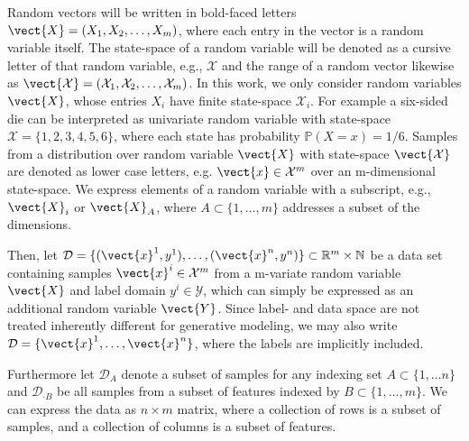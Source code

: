     Random vectors will be written in bold-faced letters $\vect{X} = (X_1, X_2, \ldots, X_m)$, where each entry in the vector is a random variable itself.
    The state-space of a random variable will be denoted as a cursive letter of that random variable, e.g., $\mathcal{X}$ and the range of a random vector likewise as $\vect{\mathcal{X}} = (\mathcal{X}_1, \mathcal{X}_2, \ldots, \mathcal{X}_m)$. 
    In this work, we only consider random variables $\vect{X}$, whose entries $X_i$ have finite state-space $\mathcal{X}_i$.
    For example a six-sided die can be interpreted as univariate random variable with state-space $\mathcal{X} = \{1,2,3,4,5,6\}$, where each state has probability $\mathbb{P}(X=x) = 1/6$.
    Samples from a distribution over random variable $\vect{X}$  with state-space $\vect{\mathcal{X}}$ are denoted as lower case letters, e.g. $\vect{x} \in \mathcal{X}^m$ over an m-dimensional state-space.
    We express elements of a random variable with a  subscript, e.g., $\vect{X}_i$ or $\vect{X}_A$, where $A \subset\{1, \ldots, m\} $ addresses a subset of the dimensions.

    Then, let $\mathcal{D} = \{(\vect{x}^1, y^1), \ldots, (\vect{x}^n, y^n)\} \subset \mathbb{R}^m \times \mathbb{N}$ be a data set containing samples $\vect{x}^i \in \mathcal{X}^m$ from a m-variate random variable $\vect{X}$ and label domain $y^i \in \mathcal{Y}$, which can simply be expressed as an additional random variable $\vect{Y}$.
    Since label- and data space are not treated inherently different for generative modeling, we may also write $\mathcal{D} = \{\vect{x}^1, \ldots, \vect{x}^n\}$, where the labels are implicitly included.

    Furthermore let $\mathcal{D}_A$ denote a subset of samples for any indexing set $A\subset \{1, \ldots n\}$ and $\mathcal{D}_{\cdot B}$ be all samples from a subset of features indexed by $B \subset \{1, \ldots, m\}$.
    We can express the data as $n \times m$ matrix, where a collection of rows is a subset of samples, and a collection of columns is a subset of features.

